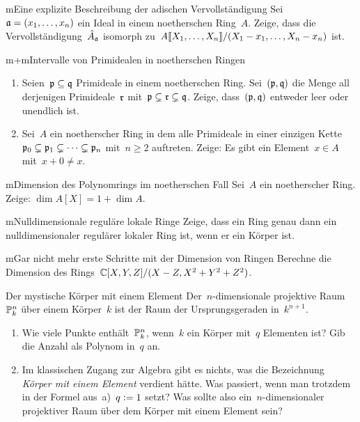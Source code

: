 \documentclass[entwurf]{uebblatt}
\begin{document}

\begin{aufgabe}{m}{Eine explizite Beschreibung der adischen Vervollständigung}
Sei~$\mathfrak{a} = (x_1,\ldots,x_n)$ ein Ideal in einem noetherschen Ring~$A$. Zeige,
dass die Vervollständigung~$\hat A_{\mathfrak{a}}$ isomorph
zu~${A}\llbracket{X_1,\ldots,X_n}\rrbracket/(X_1-x_1,\ldots,X_n-x_n)$ ist.
\end{aufgabe}

\begin{aufgabe}{m+m}{Intervalle von Primidealen in noetherschen Ringen}
\begin{enumerate}
\item
Seien~$\mathfrak{p} \subseteq \mathfrak{q}$ Primideale in einem
noetherschen Ring. Sei~$(\mathfrak{p},\mathfrak{q})$ die Menge all derjenigen Primideale~$\mathfrak{r}$
mit~$\mathfrak{p} \subsetneq \mathfrak{r} \subsetneq \mathfrak{q}$. Zeige, dass~$(\mathfrak{p},\mathfrak{q})$ entweder
leer oder unendlich ist.
\item Sei~$A$ ein noetherscher Ring in dem alle Primideale in einer einzigen Kette~$\mathfrak{p}_0
\subsetneq \mathfrak{p}_1 \subsetneq \cdots \subsetneq \mathfrak{p}_n$ mit~$n \geq 2$ auftreten.
Zeige: Es gibt ein Element~$x \in A$ mit~$x + 0 \neq x$.
\end{enumerate}
\end{aufgabe}

\begin{aufgabe}{m}{Dimension des Polynomrings im noetherschen Fall}
Sei~$A$ ein noetherscher Ring. Zeige: $\dim A[X] = 1 + \dim A$.
\end{aufgabe}

\begin{aufgabe}{m}{Nulldimensionale reguläre lokale Ringe}
Zeige, dass ein Ring genau dann ein nulldimensionaler regulärer lokaler Ring
ist, wenn er ein Körper ist.
\end{aufgabe}

\begin{aufgabe}{m}{Gar nicht mehr erste Schritte mit der Dimension von Ringen}
Berechne die Dimension des Rings~$\mathbb{C}[X,Y,Z]/(X-Z, X^2+Y^2+Z^2)$.
\end{aufgabe}

\begin{aufgabe}{0}{Der mystische Körper mit einem Element}
\scriptsize
Der~$n$-dimensionale projektive Raum~$\mathbb{P}^n_k$ über einem Körper~$k$ ist der
Raum der Ursprungsgeraden in~$k^{n+1}$.
\begin{enumerate}
\item Wie viele Punkte enthält~$\mathbb{P}^n_k$, wenn~$k$ ein Körper mit~$q$
Elementen ist? Gib die Anzahl als Polynom in~$q$ an.
\item Im klassischen Zugang zur Algebra gibt es nichts, was die Bezeichnung
\emph{Körper mit einem Element} verdient hätte. Was passiert, wenn man trotzdem
in der Formel aus~a)~$q \vcentcolon= 1$ setzt? Was sollte also ein~$n$-dimensionaler
projektiver Raum über dem Körper mit einem Element sein?
\end{enumerate}
\end{aufgabe}
\end{document}

